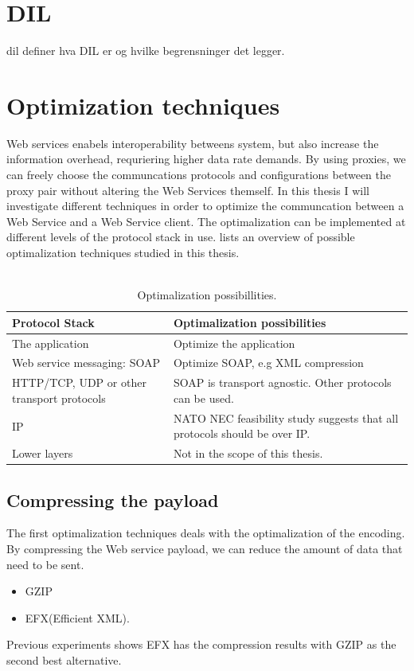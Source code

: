 \documentclass[USenglish]{article}
\begin{document}
\section{DIL}
\gls{dil} definer hva DIL er og hvilke begrensninger det legger.

\section{Optimization techniques}
Web services enabels interoperability betweens system, but also increase the information overhead, requriering higher data rate demands. By using proxies, we can freely choose the communcations protocols and configurations between the proxy pair without altering the Web Services themself. In this thesis I will investigate different techniques in order to optimize the communcation between a Web Service and a Web Service client. The optimalization can be implemented at different levels of the protocol stack in use.  lists an overview of possible optimalization techniques studied in this thesis.
\\ \\

\begin{table}[h]
\begin{tabularx}{\textwidth}{| X | X |}
\hline
  \textbf{Protocol Stack} & \textbf{Optimalization possibilities} \\ \hline
  The application & Optimize the application\\ \hline
  Web service messaging: SOAP & Optimize SOAP, e.g XML compression \\ \hline
  HTTP/TCP, UDP or other transport protocols & SOAP is transport agnostic. Other protocols can be used. \\ \hline
  IP & NATO NEC feasibility study suggests that all protocols should be over IP. \\ \hline
  Lower layers & Not in the scope of this thesis. \\ \hline
\end{tabularx}
\caption{Optimalization possibillities.} \label{table:optimalization-overview}
\end{table}


\subsection{Compressing the payload}
The first optimalization techniques deals with the optimalization of the encoding. By compressing the Web service payload, we can reduce the amount of data that need to be sent.
\begin{itemize}
\item GZIP
\item EFX(Efficient XML).
\end{itemize}
Previous experiments shows EFX has the compression results with GZIP as the second best alternative\cite{johnsen-trude-compression-techniqes}.
\end{document}
